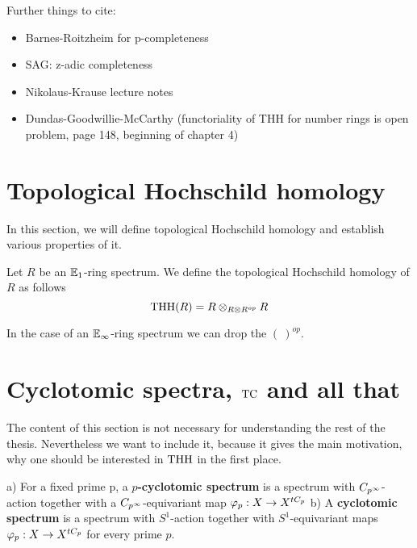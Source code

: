 Further things to cite:
\begin{itemize}
    \item Barnes-Roitzheim for p-completeness \cite[Section~8.4.1]{barnesroitzheimfoundation}
    \item SAG: z-adic completeness \cite[Section~7.3]{SAG}
    
    \item Nikolaus-Krause lecture notes 
    \item Dundas-Goodwillie-McCarthy (functoriality of THH for number rings is open problem, page 148, beginning of chapter 4)
    \cite[148]{DundasGoodwillieMccarthyLocalstructure}
\end{itemize}




\section{Topological Hochschild homology}
In this section, we will define topological Hochschild homology and establish various properties of it.

\begin{defn}
    Let $R$ be an $\mathbb{E}_1$-ring spectrum.
    We define the topological Hochschild homology of $R$ as follows
    \begin{equation*}
        \operatorname{THH}(R)=R\otimes_{R\otimes R^{op}}R
    \end{equation*}
    \end{defn}
    In the case of an $\mathbb{E}_\infty$-ring spectrum we can drop the $(\:)^{op}$. 

\section{Cyclotomic spectra, $\operatorname{TC}$ and all that}
The content of this section is not necessary for understanding the rest of the thesis. Nevertheless we want to include it, because it gives the main motivation, why one should be interested in $\operatorname{THH}$ in the first place. 



\begin{defn}\cite[Chapter~2.1]{NS}
a) For a fixed prime p, a \textbf{$p$-cyclotomic spectrum} is a spectrum with $C_{p^\infty}$-action together with a $C_{p^\infty}$-equivariant map $\varphi_p: X \rightarrow X^{tC_p}$ \newline
b) A \textbf{cyclotomic spectrum} is a spectrum with $S^1$-action together with  $S^1$-equivariant maps $\varphi_p: X \rightarrow X^{tC_p}$ for every prime $p$.
\end{defn}

